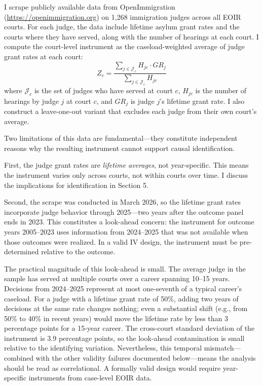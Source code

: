 \documentclass[12pt]{article}
\begin{document}
I scrape publicly available data from OpenImmigration (\url{https://openimmigration.org}) on 1,268 immigration judges across all EOIR courts. For each judge, the data include lifetime asylum grant rates and the courts where they have served, along with the number of hearings at each court. I compute the court-level instrument as the caseload-weighted average of judge grant rates at each court:
\begin{equation}
Z_c = \frac{\sum_{j \in \mathcal{J}_c} H_{jc} \cdot GR_j}{\sum_{j \in \mathcal{J}_c} H_{jc}}
\end{equation}
where $\mathcal{J}_c$ is the set of judges who have served at court $c$, $H_{jc}$ is the number of hearings by judge $j$ at court $c$, and $GR_j$ is judge $j$'s lifetime grant rate. I also construct a leave-one-out variant that excludes each judge from their own court's average.

Two limitations of this data are fundamental---they constitute independent reasons why the resulting instrument cannot support causal identification.

First, the judge grant rates are \textit{lifetime averages}, not year-specific. This means the instrument varies only across courts, not within courts over time. I discuss the implications for identification in Section 5.

Second, the scrape was conducted in March 2026, so the lifetime grant rates incorporate judge behavior through 2025---two years after the outcome panel ends in 2023. This constitutes a look-ahead concern: the instrument for outcome years 2005--2023 uses information from 2024--2025 that was not available when those outcomes were realized. In a valid IV design, the instrument must be pre-determined relative to the outcome.

The practical magnitude of this look-ahead is small. The average judge in the sample has served at multiple courts over a career spanning 10--15 years. Decisions from 2024--2025 represent at most one-seventh of a typical career's caseload. For a judge with a lifetime grant rate of 50\%, adding two years of decisions at the same rate changes nothing; even a substantial shift (e.g., from 50\% to 40\% in recent years) would move the lifetime rate by less than 3 percentage points for a 15-year career. The cross-court standard deviation of the instrument is 3.9 percentage points, so the look-ahead contamination is small relative to the identifying variation. Nevertheless, this temporal mismatch---combined with the other validity failures documented below---means the analysis should be read as correlational. A formally valid design would require year-specific instruments from case-level EOIR data.
\end{document}
